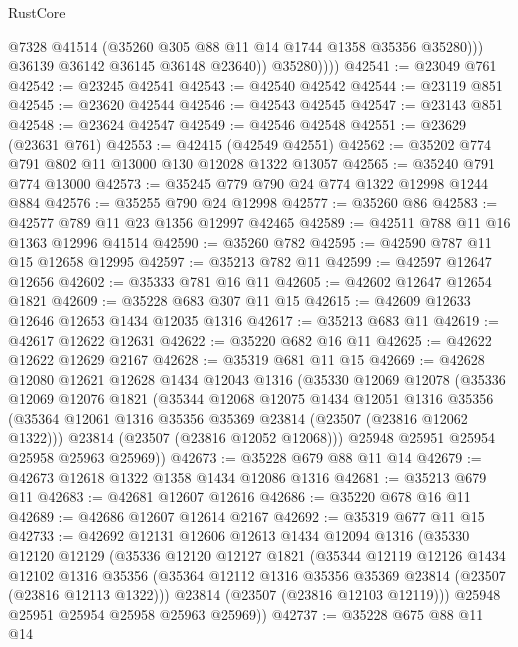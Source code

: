 \begin{lexlean}{RustCore}
\begin{coremodule}
                    @7328
                    @41514
                    (@35260 @305 @88 @11 @14 @1744 @1358 @35356 @35280)))
                @36139
                @36142
                @36145
                @36148
                @23640))
            @35280))))
@42541 := @23049 @761
@42542 := @23245 @42541
@42543 := @42540 @42542
@42544 := @23119 @851
@42545 := @23620 @42544
@42546 := @42543 @42545
@42547 := @23143 @851
@42548 := @23624 @42547
@42549 := @42546 @42548
@42551 := @23629 (@23631 @761)
@42553 := @42415 (@42549 @42551)
@42562 := @35202 @774 @791 @802 @11 @13000 @130 @12028 @1322 @13057
@42565 := @35240 @791 @774 @13000
@42573 := @35245 @779 @790 @24 @774 @1322 @12998 @1244 @884
@42576 := @35255 @790 @24 @12998
@42577 := @35260 @86
@42583 := @42577 @789 @11 @23 @1356 @12997 @42465
@42589 := @42511 @788 @11 @16 @1363 @12996 @41514
@42590 := @35260 @782
@42595 := @42590 @787 @11 @15 @12658 @12995
@42597 := @35213 @782 @11
@42599 := @42597 @12647 @12656
@42602 := @35333 @781 @16 @11
@42605 := @42602 @12647 @12654 @1821
@42609 := @35228 @683 @307 @11 @15
@42615 := @42609 @12633 @12646 @12653 @1434 @12035 @1316
@42617 := @35213 @683 @11
@42619 := @42617 @12622 @12631
@42622 := @35220 @682 @16 @11
@42625 := @42622 @12622 @12629 @2167
@42628 := @35319 @681 @11 @15
@42669 := @42628
    @12080
    @12621
    @12628
    @1434
    @12043
    @1316
    (@35330
      @12069
      @12078
      (@35336
        @12069
        @12076
        @1821
        (@35344
          @12068
          @12075
          @1434
          @12051
          @1316
          @35356
          (@35364 @12061 @1316 @35356 @35369 @23814 (@23507 (@23816 @12062 @1322)))
          @23814
          (@23507 (@23816 @12052 @12068)))
        @25948
        @25951
        @25954
        @25958
        @25963
        @25969))
@42673 := @35228 @679 @88 @11 @14
@42679 := @42673 @12618 @1322 @1358 @1434 @12086 @1316
@42681 := @35213 @679 @11
@42683 := @42681 @12607 @12616
@42686 := @35220 @678 @16 @11
@42689 := @42686 @12607 @12614 @2167
@42692 := @35319 @677 @11 @15
@42733 := @42692
    @12131
    @12606
    @12613
    @1434
    @12094
    @1316
    (@35330
      @12120
      @12129
      (@35336
        @12120
        @12127
        @1821
        (@35344
          @12119
          @12126
          @1434
          @12102
          @1316
          @35356
          (@35364 @12112 @1316 @35356 @35369 @23814 (@23507 (@23816 @12113 @1322)))
          @23814
          (@23507 (@23816 @12103 @12119)))
        @25948
        @25951
        @25954
        @25958
        @25963
        @25969))
@42737 := @35228 @675 @88 @11 @14

\end{coremodule}
\end{lexlean}
